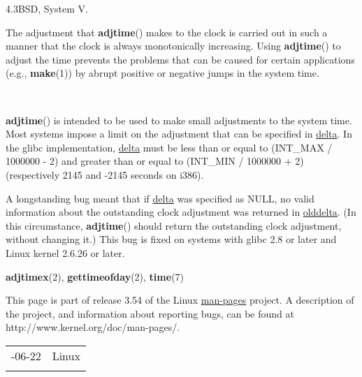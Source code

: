\documentclass[]{article}
\let\realtextbf=\textbf
\renewcommand{\textbf}[1]{\textcolor{boldcolor}{\realtextbf{#1}}}
\renewcommand{\emph}[1]{\underline{#1}}
\begin{document}
4.3BSD, System V.


The adjustment that \textbf{adjtime}() makes to the clock is carried out
in such a manner that the clock is always monotonically increasing.
Using \textbf{adjtime}() to adjust the time prevents the problems that
can be caused for certain applications (e.g., \textbf{make}(1)) by
abrupt positive or negative jumps in the system time.

~

\textbf{adjtime}() is intended to be used to make small adjustments to
the system time. Most systems impose a limit on the adjustment that can
be specified in \emph{delta}. In the glibc implementation, \emph{delta}
must be less than or equal to (INT\_MAX / 1000000 - 2) and greater than
or equal to (INT\_MIN / 1000000 + 2) (respectively 2145 and -2145
seconds on i386).


A longstanding bug meant that if \emph{delta} was specified as NULL, no
valid information about the outstanding clock adjustment was returned in
\emph{olddelta}. (In this circumstance, \textbf{adjtime}() should return
the outstanding clock adjustment, without changing it.) This bug is
fixed on systems with glibc 2.8 or later and Linux kernel 2.6.26 or
later.


\textbf{adjtimex}(2), \textbf{gettimeofday}(2), \textbf{time}(7)


This page is part of release 3.54 of the Linux \emph{man-pages} project.
A description of the project, and information about reporting bugs, can
be found at http://www.kernel.org/doc/man-pages/.

\begin{longtable}[c]{@{}ll@{}}
\toprule\addlinespace
2008-06-22 & Linux
\\\addlinespace
\bottomrule
\end{longtable}
\end{document}
